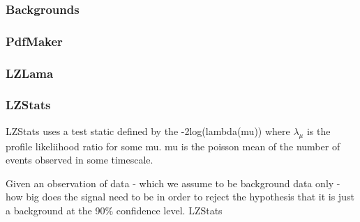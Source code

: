 \subsubsection{Backgrounds}
\subsubsection{PdfMaker}
\subsubsection{LZLama}
\subsubsection{LZStats}
\par
LZStats uses a test static defined by the -2log(lambda(mu)) where $\lambda_{\mu}$ is the profile likeliihood ratio for some mu. 
mu is the poisson mean of the number of events observed in some timescale.

\par
Given an observation of data - which we assume to be background data only - how big does the signal need to be in order to reject the hypothesis that it is just a background at the 90\% confidence level.
LZStats \cite{LZ_Ibles_LZStats_Thesis_ref}

